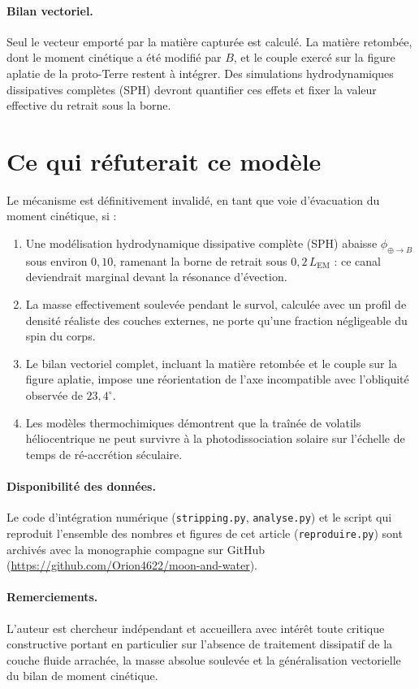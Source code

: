 \documentclass[11pt,a4paper]{article}
\begin{document}
\paragraph{Bilan vectoriel.} Seul le vecteur emporté par la matière capturée est calculé. La matière retombée, dont le moment cinétique a été modifié par $B$, et le couple exercé sur la figure aplatie de la proto-Terre restent à intégrer. Des simulations hydrodynamiques dissipatives complètes (SPH) devront quantifier ces effets et fixer la valeur effective du retrait sous la borne.

\section{Ce qui réfuterait ce modèle}

Le mécanisme est définitivement invalidé, en tant que voie d'évacuation du moment cinétique, si :
\begin{enumerate}
    \item Une modélisation hydrodynamique dissipative complète (SPH) abaisse $\phi_{\oplus\to B}$ sous environ $0{,}10$, ramenant la borne de retrait sous $0{,}2\,L_{\mathrm{EM}}$ : ce canal deviendrait marginal devant la résonance d'évection.
    \item La masse effectivement soulevée pendant le survol, calculée avec un profil de densité réaliste des couches externes, ne porte qu'une fraction négligeable du spin du corps.
    \item Le bilan vectoriel complet, incluant la matière retombée et le couple sur la figure aplatie, impose une réorientation de l'axe incompatible avec l'obliquité observée de $23{,}4^\circ$.
    \item Les modèles thermochimiques démontrent que la traînée de volatils héliocentrique ne peut survivre à la photodissociation solaire sur l'échelle de temps de ré-accrétion séculaire.
\end{enumerate}

\paragraph{Disponibilité des données.} Le code d'intégration numérique (\texttt{stripping.py}, \texttt{analyse.py}) et le script qui reproduit l'ensemble des nombres et figures de cet article (\texttt{reproduire.py}) sont archivés avec la monographie compagne \cite{Debailleul2026} sur GitHub (\url{https://github.com/Orion4622/moon-and-water}).

\paragraph{Remerciements.} L'auteur est chercheur indépendant et accueillera avec intérêt toute critique constructive portant en particulier sur l'absence de traitement dissipatif de la couche fluide arrachée, la masse absolue soulevée et la généralisation vectorielle du bilan de moment cinétique.
\end{document}

